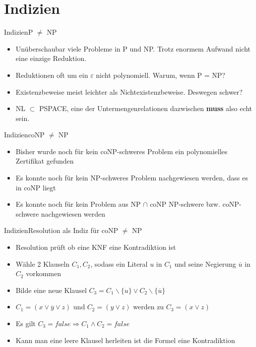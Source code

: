 \documentclass[ignorenonframetext,]{beamer}
\begin{document}
\section{Indizien}\label{indizien}

\begin{frame}{Indizien}{P $\neq$ NP}

\begin{itemize}
\itemsep1pt\parskip0pt
\item
  Unüberschaubar viele Probleme in P und NP. Trotz enormem Aufwand nicht
  eine einzige Reduktion.
\item
  Reduktionen oft um ein $\varepsilon$ nicht polynomiell. Warum, wenn P
  = NP?
\item
  Existenzbeweise meist leichter als Nichtexistenzbeweise. Deswegen
  schwer?
\item
  NL $\subset$ PSPACE, eine der Untermengenrelationen dazwischen
  \textbf{muss} also echt sein.
\end{itemize}

\end{frame}

\begin{frame}{Indizien}{coNP $\neq$ NP}

\begin{itemize}
\itemsep1pt\parskip0pt
\item
  Bisher wurde noch für kein coNP-schweres Problem ein polynomielles
  Zertifikat gefunden
\item
  Es konnte noch für kein NP-schweres Problem nachgewiesen werden, dass
  es in coNP liegt
\item
  Es konnte noch für kein Problem aus NP $\cap$ coNP NP-schwere bzw.
  coNP-schwere nachgewiesen werden
\end{itemize}

\end{frame}

\begin{frame}{Indizien}{Resolution als Indiz für coNP $\neq$ NP}

\begin{itemize}
\itemsep1pt\parskip0pt
\item
  Resolution prüft ob eine KNF eine Kontradiktion ist
\item
  Wähle 2 Klauseln $C_1, C_2$, sodass ein Literal $u$ in $C_1$ und seine
  Negierung $\overline{u}$ in $C_2$ vorkommen
\item
  Bilde eine neue Klausel
  $C_3 = C_1 \backslash \{u\} \vee C_2 \backslash \{\overline{u}\}$
\item
  $C_1 = (x \vee \overline{y} \vee z)$ und $C_2 = (y \vee z)$ werden zu
  $C_3 = (x \vee z)$
\item
  Es gilt $C_3 = false \Rightarrow C_1 \wedge C_2 = false$
\item
  Kann man eine leere Klausel herleiten ist die Formel eine
  Kontradiktion
\end{itemize}

\end{frame}
\end{document}
